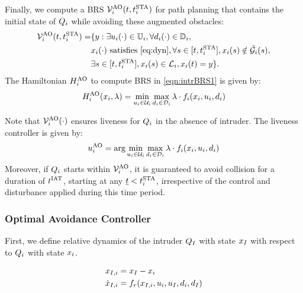 Finally, we compute a BRS $\mathcal{V}^{\text{AO}}_{i}(t, t^\text{STA}_i)$ for path planning that contains the initial state of $Q_i$ while avoiding these augmented obstacles:
\begin{equation} \label{eqn:intrBRS1}
\begin{aligned}
\brs^{\text{AO}}_{i}(t, \sta_i) = & \{y: \exists \ctrl_i(\cdot) \in \cfset_i, \forall \dstb_i(\cdot) \in \dfset_i, \\
& \state_i(\cdot) \text{ satisfies \eqref{eq:dyn}}, \forall s \in [t, \sta_i], \state_i(s) \notin \tilde\obsset_i(s), \\
& \exists s \in [t, \sta_i], \state_i(s) \in \targetset_i, \state_i(t) = y \}.
\end{aligned}
\end{equation}
The Hamiltonian $H^{\text{AO}}_{i}$ to compute BRS in \eqref{eqn:intrBRS1} is given by:
\begin{equation} \label{eqn:BRSham}
\ham^{\text{AO}}_{i}(\state_i, \costate) = \min_{\ctrl_i \in \cset_i} \max_{\dstb_i \in \dset_i} \costate \cdot f_i (\state_i, \ctrl_i, \dstb_i)
\end{equation}

Note that $\mathcal{V}^{\text{AO}}_{i}(\cdot)$ ensures liveness for $Q_i$ in the absence of intruder. The liveness controller is given by:
\begin{equation}
{u^{\text{AO}}_{i}} = \arg \min_{u_i \in \mathcal{U}_i} \max_{d_i \in \mathcal{D}_i} \lambda \cdot f_i (x_i, u_i, d_i)
\end{equation}
Moreover, if $Q_i$ starts within $\mathcal{V}^{\text{AO}}_{i}$, it is guaranteed to avoid collision for a duration of $t^\text{IAT}$, starting at any $\underline{t} < t^\text{STA}_i$, irrespective of the control and disturbance applied during this time period. 

\subsubsection{Optimal Avoidance Controller} \label{sec:intruder_avoid}
First, we define relative dynamics of the intruder $Q_{I}$ with state $x_I$ with respect to $Q_i$ with state $x_i$.

\begin{equation}
\label{eq:reldyn}
\begin{aligned}
\state_{\intr, i} &= \state_\intr - \state_i \\
\dot \state_{\intr, i} &= f_r(\state_{\intr, i}, \ctrl_i, \ctrl_\intr, \dstb_i, \dstb_\intr)
\end{aligned}
\end{equation}

